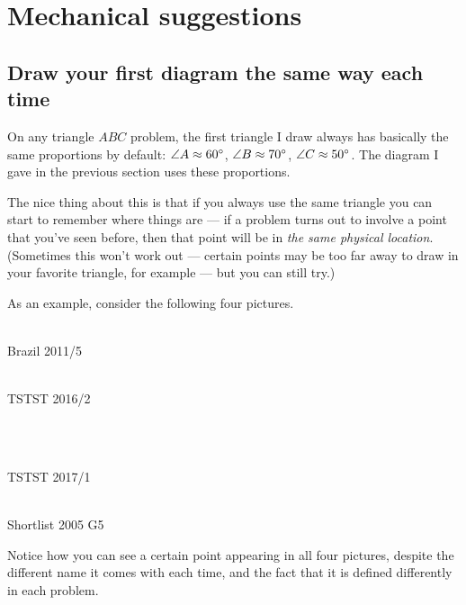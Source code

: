 \documentclass[11pt]{scrartcl}
\begin{document}
\section{Mechanical suggestions}
\subsection{Draw your first diagram the same way each time}
On any triangle $ABC$ problem, the first triangle I draw
always has basically the same proportions by default:
$\angle A \approx 60^\circ$, $\angle B \approx 70^\circ$, $\angle C \approx 50^\circ$.
The diagram I gave in the previous section uses these proportions.

The nice thing about this is that
\alert{if you always use the same triangle
you can start to remember where things are} --- if a problem
turns out to involve a point that you've seen before,
then that point will be in \emph{the same physical location}.
(Sometimes this won't work out ---
certain points may be too far away to draw in your favorite triangle,
for example --- but you can still try.)


As an example, consider the following four pictures.
\begin{center}
  \begin{minipage}[t]{6.5cm}
  \\ \centering \sffamily Brazil 2011/5
  \end{minipage}
  \quad
  \begin{minipage}[t]{6.5cm}
  \\ \centering \sffamily TSTST 2016/2
  \end{minipage}
  \\
  \begin{minipage}[t]{6.5cm}
  \\ \centering \sffamily TSTST 2017/1
  \end{minipage}
  \quad
  \begin{minipage}[t]{6.5cm}
  \\ \centering \sffamily Shortlist 2005 G5
  \end{minipage}
\end{center}
Notice how you can see a certain point appearing in all four pictures,
despite the different name it comes with each time,
and the fact that it is defined differently in each problem.
\end{document}
